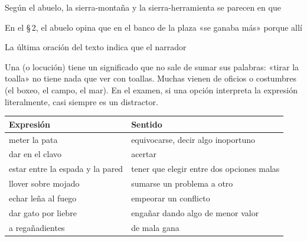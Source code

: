 \taller
{}
\begin{ejercicios}
\item Según el abuelo, la sierra-montaña y la sierra-herramienta se parecen en que
\item En el \S\,2, el abuelo opina que en el banco de la plaza «se ganaba más» porque allí
\item La última oración del texto indica que el narrador
\end{ejercicios}

\bitacora


Una  (o locución) tiene un significado que no sale de sumar sus palabras: «tirar la toalla» no tiene
nada que ver con toallas. Muchas vienen de oficios o costumbres (el boxeo, el campo, el mar). En el examen, si una opción
interpreta la expresión literalmente, casi siempre es un distractor.

\begin{center}\small
\begin{tabularx}{\linewidth}{@{}l>{\raggedright\arraybackslash}X@{}}
\toprule
\textbf{Expresión} & \textbf{Sentido}\\\midrule
meter la pata & equivocarse, decir algo inoportuno\\
dar en el clavo & acertar\\
estar entre la espada y la pared & tener que elegir entre dos opciones malas\\
llover sobre mojado & sumarse un problema a otro\\
echar leña al fuego & empeorar un conflicto\\
dar gato por liebre & engañar dando algo de menor valor\\
a regañadientes & de mala gana\\\bottomrule
\end{tabularx}
\end{center}

